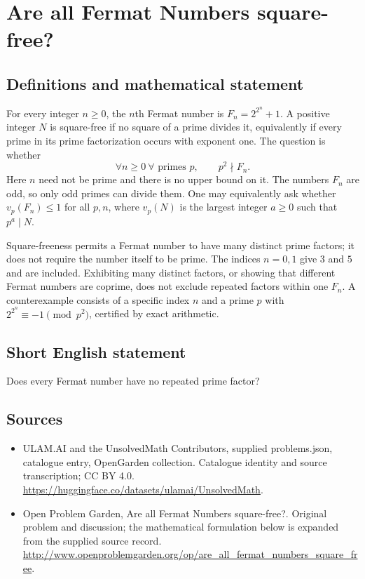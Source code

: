 \documentclass[11pt,a4paper]{article}
\begin{document}
\section*{Are all Fermat Numbers square-free?}\label{statement}

\subsection{Definitions and mathematical statement}
For every integer $n\ge0$, the $n$th Fermat number is
$F_n=2^{2^n}+1$. A positive integer $N$ is square-free if no square
of a prime divides it, equivalently if every prime in its prime
factorization occurs with exponent one. The question is whether
\[
 \forall n\ge0\ \forall\text{ primes }p,\qquad p^2\nmid F_n.
\]
Here $n$ need not be prime and there is no upper bound on it. The
numbers $F_n$ are odd, so only odd primes can divide them. One may
equivalently ask whether $v_p(F_n)\le1$ for all $p,n$, where
$v_p(N)$ is the largest integer $a\ge0$ such that $p^a\mid N$.

Square-freeness permits a Fermat number to have many distinct prime
factors; it does not require the number itself to be prime. The
indices $n=0,1$ give $3$ and $5$ and are included. Exhibiting many
distinct factors, or showing that different Fermat numbers are
coprime, does not exclude repeated factors within one $F_n$.
A counterexample consists of a specific index $n$ and a prime $p$
with $2^{2^n}\equiv-1\pmod{p^2}$, certified by exact arithmetic.
\subsection{Short English statement}
Does every Fermat number have no repeated prime factor?
\subsection{Sources}
\begin{itemize}
\item[S1] ULAM.AI and the UnsolvedMath Contributors, supplied problems.json, catalogue entry, OpenGarden collection. Catalogue identity and source transcription; CC BY 4.0.
\url{https://huggingface.co/datasets/ulamai/UnsolvedMath}.
\item[S2] Open Problem Garden, Are all Fermat Numbers square-free?. Original problem and discussion; the mathematical formulation below is expanded from the supplied source record.
\url{http://www.openproblemgarden.org/op/are_all_fermat_numbers_square_free}.
\end{itemize}
\end{document}
